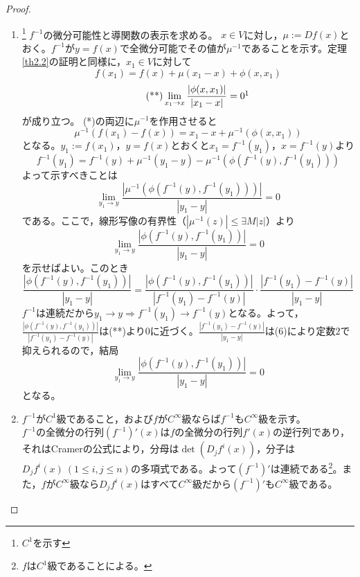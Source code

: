 \begin{proof}
\begin{enumerate}
	\item\footnote{$C^1$を示す}
	$f^{-1}$の微分可能性と導関数の表示を求める。
	$x\in V$に対し，$\mu:=Df(x)$とおく。$f^{-1}$が$y=f(x)$で全微分可能でその値が$\mu^{-1}$であることを示す。定理\ref{th2.2}の証明と同様に，$x_1\in V$に対して
	\begin{equation}\tag{*}
		f(x_1)=f(x)+\mu(x_1-x)+\phi(x,x_1)
	\end{equation}
	\begin{equation}\tag{**}
	\lim_{x_1\to x}\frac{|\phi(x,x_1)|}{|x_1-x|}=0\footnotemark
	\end{equation}
	が成り立つ。
	(*)の両辺に$\mu^{-1}$を作用させると
	\[
	\mu^{-1}(f(x_1)-f(x))=x_1-x+\mu^{-1}(\phi(x,x_1))
	\]
	となる。$y_1:=f(x_1)$，$y=f(x)$とおくと$x_1=f^{-1}(y_1)$，$x=f^{-1}(y)$より
	\begin{equation}\tag{*'}
		f^{-1}(y_1)=f^{-1}(y)+\mu^{-1}(y_1-y)-\mu^{-1}(\phi(f^{-1}(y),f^{-1}(y_1)))
	\end{equation}
	よって示すべきことは
	\[
	\lim_{y_1\to y}\frac{|\mu^{-1}(\phi(f^{-1}(y),f^{-1}(y_1)))|}{|y_1-y|}=0
	\]
	である。ここで，線形写像の有界性（$|\mu^{-1}(z)|\leq\exists M|z|$）より
	\[
	\lim_{y_1\to y}\frac{|\phi(f^{-1}(y),f^{-1}(y_1))|}{|y_1-y|}=0
	\]
	を示せばよい。このとき
	\[
		\frac{|\phi(f^{-1}(y),f^{-1}(y_1))|}{|y_1-y|}=\frac{|\phi(f^{-1}(y),f^{-1}(y_1))|}{|f^{-1}(y_1)-f^{-1}(y)|}\cdot\frac{|f^{-1}(y_1)-f^{-1}(y)|}{|y_1-y|}
	\]
	$f^{-1}$は連続だから$y_1\to y \Rightarrow f^{-1}(y_1)\to f^{-1}(y)$となる。よって，$\displaystyle \frac{|\phi(f^{-1}(y),f^{-1}(y_1))|}{|f^{-1}(y_1)-f^{-1}(y)|}$は(**)より$0$に近づく。$\displaystyle \frac{|f^{-1}(y_1)-f^{-1}(y)|}{|y_1-y|}$は(6)により定数$2$で抑えられるので，結局
	\[
	\lim_{y_1\to y}\frac{|\phi(f^{-1}(y),f^{-1}(y_1))|}{|y_1-y|}=0
	\]
	となる。

	\item $f^{-1}$が$C^1$級であること，および$f$が$C^\infty$級ならば$f^{-1}$も$C^\infty$級を示す。\\
	$f^{-1}$の全微分の行列$(f^{-1})'(x)$は$f$の全微分の行列$f'(x)$の逆行列であり，それはCramerの公式により，分母は$\det(D_jf^i(x))$，分子は$D_jf^i(x)\ (1\leq i,j\leq n)$の多項式である。よって$(f^{-1})'$は連続である\footnote{$f$は$C^1$級であることによる。}。また，$f$が$C^\infty$級なら$D_jf^i(x)$はすべて$C^\infty$級だから$(f^{-1})'$も$C^\infty$級である。
	\end{enumerate}
\end{proof}
